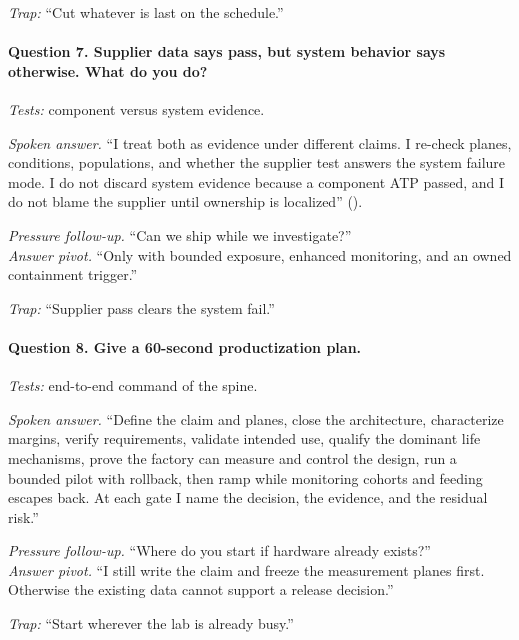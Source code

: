 \textit{Trap:} ``Cut whatever is last on the schedule.''

\paragraph{Question 7. Supplier data says pass, but system behavior says
otherwise. What do you do?}
\textit{Tests:} component versus system evidence.

\textit{Spoken answer.}
``I treat both as evidence under different claims. I re-check planes,
conditions, populations, and whether the supplier test answers the system
failure mode. I do not discard system evidence because a component ATP passed,
and I do not blame the supplier until ownership is localized''
().

\textit{Pressure follow-up.} ``Can we ship while we investigate?''\\
\textit{Answer pivot.} ``Only with bounded exposure, enhanced monitoring, and
an owned containment trigger.''

\textit{Trap:} ``Supplier pass clears the system fail.''

\paragraph{Question 8. Give a 60-second productization plan.}
\textit{Tests:} end-to-end command of the spine.

\textit{Spoken answer.}
``Define the claim and planes, close the architecture, characterize margins,
verify requirements, validate intended use, qualify the dominant life
mechanisms, prove the factory can measure and control the design, run a
bounded pilot with rollback, then ramp while monitoring cohorts and feeding
escapes back. At each gate I name the decision, the evidence, and the residual
risk.''

\textit{Pressure follow-up.} ``Where do you start if hardware already exists?''\\
\textit{Answer pivot.} ``I still write the claim and freeze the measurement
planes first. Otherwise the existing data cannot support a release decision.''

\textit{Trap:} ``Start wherever the lab is already busy.''
